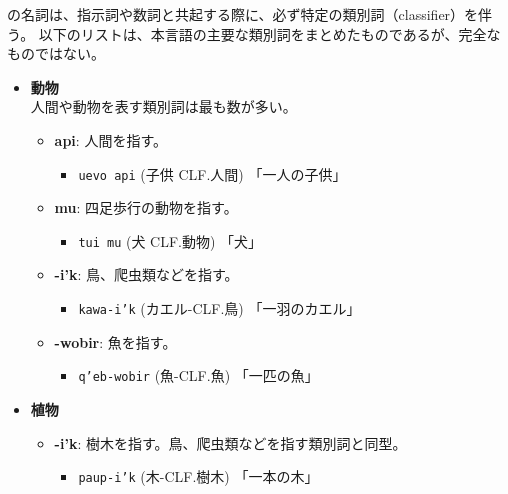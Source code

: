 \langname の名詞は、指示詞や数詞と共起する際に、必ず特定の類別詞（classifier）を伴う。
以下のリストは、本言語の主要な類別詞をまとめたものであるが、完全なものではない。

\begin{itemize}
    \item \textbf{動物}\\
    人間や動物を表す類別詞は最も数が多い。
        \begin{itemize}
            \item \textbf{api}: 人間を指す。
                \begin{itemize}
                    \item \texttt{uevo api} (子供 CLF.人間)
                    \quad 「一人の子供」
                \end{itemize}
            \item \textbf{mu}: 四足歩行の動物を指す。
                \begin{itemize}
                    \item \texttt{tui mu} (犬 CLF.動物)
                    \quad 「犬」
                \end{itemize}
            \item \textbf{-i'k}: 鳥、爬虫類などを指す。
                \begin{itemize}
                    \item \texttt{kawa-i'k} (カエル-CLF.鳥) %
                    \quad 「一羽のカエル」
                \end{itemize}
            \item \textbf{-wobir}: 魚を指す。
                \begin{itemize}
                    \item \texttt{q'eb-wobir} (魚-CLF.魚) %
                    \quad 「一匹の魚」
                \end{itemize}
        \end{itemize}
    \item \textbf{植物} %
        \begin{itemize}
            \item \textbf{-i'k}: 樹木を指す。鳥、爬虫類などを指す類別詞と同型。
                \begin{itemize}
                    \item \texttt{paup-i'k} (木-CLF.樹木) %
                    \quad 「一本の木」

\end{itemize}
\end{itemize}
\end{itemize}
